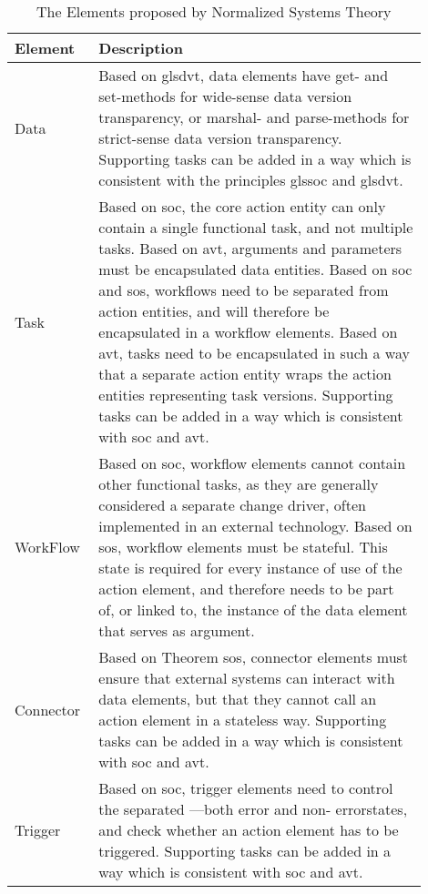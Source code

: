 \begin{table}[H]
    \begin{tabular}{ p{0.15\linewidth} p{0.75\linewidth}}
        \hline
        \textbf{Element} & \textbf{Description} \\ 
        \hline
        Data & Based on gls{dvt}, data elements have get- and set-methods for wide-sense
        data version transparency, or marshal- and parse-methods for strict-sense data
        version transparency. Supporting tasks can be added in a way which is consistent
        with the principles gls{soc} and gls{dvt}.\\
        \midrule

        Task & Based on \gls{soc}, the core action entity can only contain a single
        functional task, and not multiple tasks. Based on \gls{avt}, arguments and
        parameters must be encapsulated data entities. Based on \gls{soc} and \gls{sos},
        workflows need to be separated from action entities, and will therefore be
        encapsulated in a workflow elements. Based on \gls{avt}, tasks need to be
        encapsulated in such a way that a separate action entity wraps the action entities
        representing task versions. Supporting tasks can be added in a way which is
        consistent with \gls{soc} and \gls{avt}.\\
        \midrule

        WorkFlow & Based on \gls{soc}, workflow elements cannot contain other functional
        tasks, as they are generally considered a separate change driver, often
        implemented in an external technology. Based on \gls{sos}, workflow elements must
        be stateful. This state is required for every instance of use of the action
        element, and therefore needs to be part of, or linked to, the instance of the data
        element that serves as argument.\\ \midrule

        Connector & Based on Theorem \gls{sos}, connector elements must ensure that
        external systems can interact with data elements, but that they cannot call an
        action element in a stateless way. Supporting tasks can be added in a way which is
        consistent with \gls{soc} and \gls{avt}.\\ \midrule

        Trigger & Based on \gls{soc}, trigger elements need to control the separated —both
        error and non- errorstates, and check whether an action element has to be
        triggered. Supporting tasks can be added in a way which is consistent with
        \gls{soc} and \gls{avt}.\\

        \bottomrule
    \end{tabular}
    \caption{The Elements proposed by Normalized Systems Theory}
    \label{ns_element}
\end{table}
